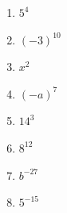 %
%
  \begin{enumerate}[cols=4]
    \item $5^{4}$
    \item $(-3)^{10}$
    \item $x^2$
    \item $(-a)^7$
    \item $14^3$
    \item $8^{12}$
    \item $b^{-27}$
    \item $5^{-15}$
  \end{enumerate}
